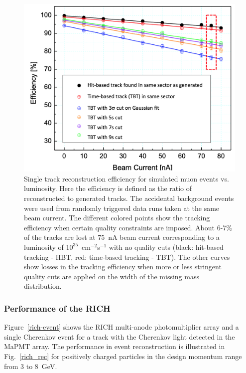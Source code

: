 \documentclass[final,3p]{elsarticle}
\begin{document}
\begin{twocolumn}
\begin{figure}[t!]
\centerline{\includegraphics[width=1.0\columnwidth]{efficiencies.png}}
\caption{Single track reconstruction efficiency for simulated muon events vs. luminosity. Here the efficiency is defined
  as the ratio of reconstructed to generated tracks. The accidental background events were used from randomly
  triggered data runs taken at the same beam current. The different colored points show the tracking efficiency when
  certain quality constraints are imposed. About 6-7\% of the tracks are lost at 75~nA beam current corresponding to a
  luminosity of $10^{35}$~cm$^{-2}$s$^{-1}$ with no quality cuts (black: hit-based tracking - HBT, red: time-based tracking
  - TBT). The other curves show losses in the tracking efficiency when more or less stringent quality cuts are applied on
  the width of the missing mass distribution.}
\label{efficiencies}
\end{figure}

\subsubsection{Performance of the RICH} 

Figure~\ref{rich-event} shows the RICH multi-anode photomultiplier array and a single Cherenkov event for a track
with the Cherenkov light detected in the MaPMT array.  The performance in event reconstruction is illustrated in
Fig.~\ref{rich_rec} for positively charged particles in the design momentum range from 3 to 8~GeV. 


\end{twocolumn}
\end{document}
